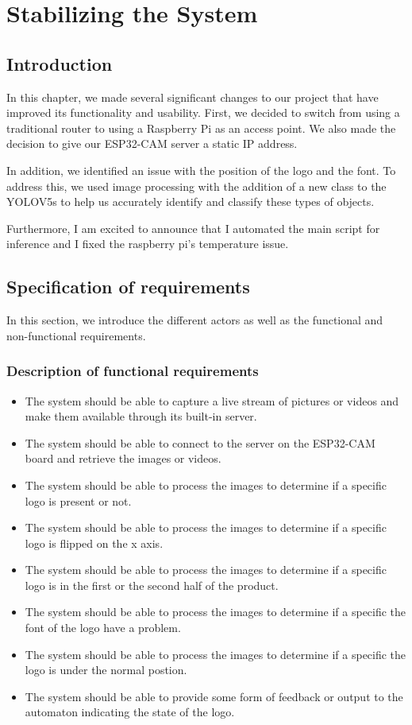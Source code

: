 %
%



\chapter{Stabilizing the System}
\section{Introduction}
In this chapter, we made several significant changes to our project that have improved its functionality and usability. First, we decided to switch from using a traditional router to using a Raspberry Pi as an access point. We also made the decision to give our ESP32-CAM server a static IP address.

In addition, we identified an issue with the position of the logo and the font. To address this, we used image processing with the addition of a new class to the YOLOV5s to help us accurately identify and classify these types of objects.

Furthermore, I am excited to announce that I automated the main script for inference and I fixed the raspberry pi's temperature issue.

\section{Specification of requirements}
In this section, we introduce the different actors as well as the functional and non-functional requirements.
\subsection{Description of functional requirements}
\begin{itemize}
\item The system should be able to capture a live stream of pictures or videos and make them available through its built-in server.
\item The system should be able to connect to the server on the ESP32-CAM board and retrieve the images or videos.
\item The system should be able to process the images to determine if a specific logo is present or not.
\item The system should be able to process the images to determine if a specific logo is flipped on the x axis.
\item The system should be able to process the images to determine if a specific logo is in the first or the second half of the product.
\item The system should be able to process the images to determine if a specific the font of the logo have a problem.
\item The system should be able to process the images to determine if a specific the logo is under the normal postion.
\item The system should be able to provide some form of feedback or output to the automaton indicating the state of the logo.

\end{itemize}
